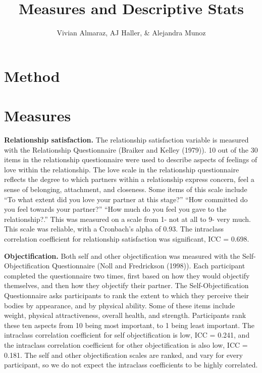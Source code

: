 \documentclass[
  english,
  man]{apa6}
\title{Measures and Descriptive Stats}
\author{Vivian Almaraz\textsuperscript{}, AJ Haller\textsuperscript{}, \& Alejandra Munoz\textsuperscript{}}
\date{}
\affiliation{\phantom{0}}
\begin{document}
\maketitle

\hypertarget{method}{%
\section{Method}\label{method}}

\hypertarget{measures}{%
\section{Measures}\label{measures}}

\textbf{Relationship satisfaction.} The relationship satisfaction variable is measured with the Relationship Questionnaire (Braiker and Kelley (1979)). 10 out of the 30 items in the relationship questionnaire were used to describe aspects of feelings of love within the relationship. The love scale in the relationship questionnaire reflects the degree to which partners within a relationship express concern, feel a sense of belonging, attachment, and closeness. Some items of this scale include ``To what extent did you love your partner at this stage?'' ``How committed do you feel towards your partner?'' ``How much do you feel you gave to the relationship?.'' This was measured on a scale from 1- not at all to 9- very much. This scale was reliable, with a Cronbach's alpha of 0.93. The intraclass correlation coefficient for relationship satisfaction was significant, ICC = 0.698.

\textbf{Objectification.} Both self and other objectification was measured with the Self-Objectification Questionnaire (Noll and Fredrickson (1998)). Each participant completed the questionnaire two times, first based on how they would objectify themselves, and then how they objectify their partner. The Self-Objectification Questionnaire asks participants to rank the extent to which they perceive their bodies by appearance, and by physical ability. Some of these items include weight, physical attractiveness, overall health, and strength. Participants rank these ten aspects from 10 being most important, to 1 being least important. The intraclass correlation coefficient for self objectification is low, ICC = 0.241, and the intraclass correlation coefficient for other objectification is also low, ICC = 0.181. The self and other objectification scales are ranked, and vary for every participant, so we do not expect the intraclass coefficients to be highly correlated.
\end{document}
